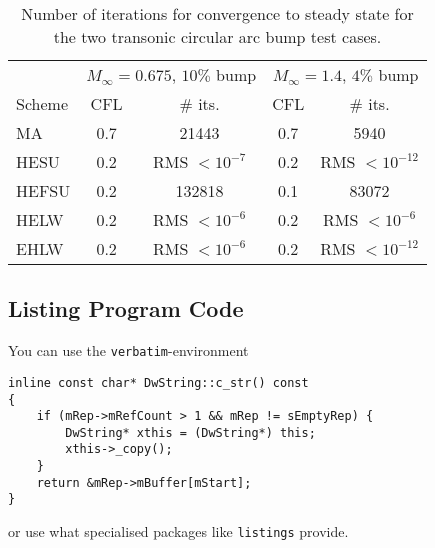 \begin{table}[htbp]
 \begin{center}
 \begin{tabular}{||l|c|c|c|c||} \hline
         & \multicolumn{2}{c|}{$M_{\infty} = 0.675$, $10\%$ bump}
         & \multicolumn{2}{c||}{$M_{\infty} = 1.4$, $4\%$ bump} \\ \cline{2-5}
  Scheme & CFL & \# its.         & CFL & \# its.          \\ \hline
  MA     & 0.7 & 21443           & 0.7 & 5940             \\
  HESU   & 0.2 & RMS $< 10^{-7}$  & 0.2 & RMS $< 10^{-12}$ \\
  HEFSU  & 0.2 & 132818          & 0.1 & 83072            \\
  HELW   & 0.2 & RMS $< 10^{-6}$  & 0.2 & RMS $< 10^{-6}$  \\
  EHLW   & 0.2 & RMS $< 10^{-6}$  & 0.2 & RMS $< 10^{-12}$ \\ \hline
 \end{tabular}
 \end{center}
 \caption{Number of iterations for convergence to steady state for
          the two transonic circular arc bump test cases.}
 \label{chtab}
\end{table}


\subsection{Listing Program Code}

You can use the \texttt{verbatim}-environment
\begin{verbatim}
inline const char* DwString::c_str() const
{
    if (mRep->mRefCount > 1 && mRep != sEmptyRep) {
        DwString* xthis = (DwString*) this;
        xthis->_copy();
    }
    return &mRep->mBuffer[mStart];
}
\end{verbatim}
or use what specialised packages like \texttt{listings} provide.

